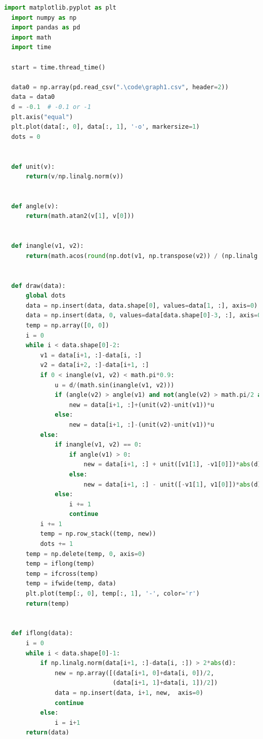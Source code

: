 \documentclass{apmcmthesis}
\begin{document}
\begin{lstlisting}[language=Python,caption={The python source code of zigzag hatch}]
  import matplotlib.pyplot as plt
  import numpy as np
  import pandas as pd
  import math
  import time
  
  start = time.thread_time()
  
  data0 = np.array(pd.read_csv(".\code\graph1.csv", header=2))
  data = data0  
  d = -0.1  # -0.1 or -1
  plt.axis("equal")
  plt.plot(data[:, 0], data[:, 1], '-o', markersize=1)
  dots = 0
  
  
  def unit(v):  
      return(v/np.linalg.norm(v))
  
  
  def angle(v):  
      return(math.atan2(v[1], v[0]))
  
  
  def inangle(v1, v2):  
      return(math.acos(round(np.dot(v1, np.transpose(v2)) / (np.linalg.norm(v1)*np.linalg.norm(v2)), 9)))
  
  
  def draw(data):  
      global dots
      data = np.insert(data, data.shape[0], values=data[1, :], axis=0)
      data = np.insert(data, 0, values=data[data.shape[0]-3, :], axis=0)
      temp = np.array([0, 0])
      i = 0
      while i < data.shape[0]-2:
          v1 = data[i+1, :]-data[i, :]
          v2 = data[i+2, :]-data[i+1, :]
          if 0 < inangle(v1, v2) < math.pi*0.9:  
              u = d/(math.sin(inangle(v1, v2)))
              if (angle(v2) > angle(v1) and not(angle(v2) > math.pi/2 and angle(v1) < -math.pi/2)) or (angle(v2) < -math.pi/2 and angle(v1) > math.pi/2):
                  new = data[i+1, :]+(unit(v2)-unit(v1))*u
              else:
                  new = data[i+1, :]-(unit(v2)-unit(v1))*u
          else:
              if inangle(v1, v2) == 0:  
                  if angle(v1) > 0:
                      new = data[i+1, :] + unit([v1[1], -v1[0]])*abs(d)
                  else:
                      new = data[i+1, :] - unit([-v1[1], v1[0]])*abs(d)
              else:  
                  i += 1
                  continue
          i += 1
          temp = np.row_stack((temp, new))
          dots += 1
      temp = np.delete(temp, 0, axis=0)
      temp = iflong(temp)  
      temp = ifcross(temp)  
      temp = ifwide(temp, data)  
      plt.plot(temp[:, 0], temp[:, 1], '-', color='r')
      return(temp)
  
  
  def iflong(data):  
      i = 0
      while i < data.shape[0]-1:  
          if np.linalg.norm(data[i+1, :]-data[i, :]) > 2*abs(d):  
              new = np.array([(data[i+1, 0]+data[i, 0])/2,
                              (data[i+1, 1]+data[i, 1])/2])
              data = np.insert(data, i+1, new,  axis=0)
              continue
          else:
              i = i+1
      return(data)
  

\end{lstlisting}
\end{document}
